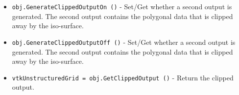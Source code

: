 \begin{itemize}
\item  \verb|obj.GenerateClippedOutputOn ()| -  Set/Get whether a second output is generated. The second output contains the
 polygonal data that is clipped away by the iso-surface.

\item  \verb|obj.GenerateClippedOutputOff ()| -  Set/Get whether a second output is generated. The second output contains the
 polygonal data that is clipped away by the iso-surface.

\item  \verb|vtkUnstructuredGrid = obj.GetClippedOutput ()| -  Return the clipped output.

\end{itemize}
